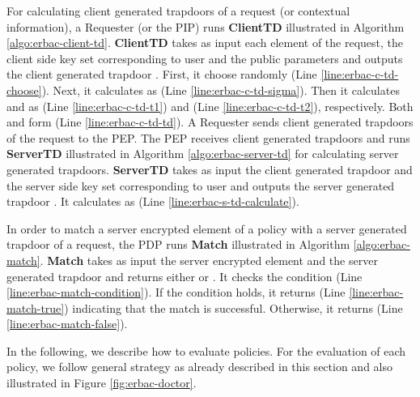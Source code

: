 \documentclass[epsfig,a4paper,11pt,titlepage]{book}
\numberwithin{algorithm}{chapter}
\begin{document}
For calculating client generated trapdoors of a request (or contextual information), a Requester (or the \gls{PIP}) runs \textbf{ClientTD} illustrated in Algorithm \ref{algo:erbac-client-td}. \textbf{ClientTD} takes as input each element  of the request, the client side key set  corresponding to user  and the public parameters  and outputs the client generated trapdoor . First, it choose randomly  (Line \ref{line:erbac-c-td-choose}). Next, it calculates  as  (Line \ref{line:erbac-c-td-sigma}). Then it calculates  and  as  (Line \ref{line:erbac-c-td-t1}) and  (Line \ref{line:erbac-c-td-t2}), respectively. Both  and  form  (Line \ref{line:erbac-c-td-td}). A Requester sends client generated trapdoors of the request to the \gls{PEP}.
The \gls{PEP} receives client generated trapdoors and runs \textbf{ServerTD} illustrated in Algorithm \ref{algo:erbac-server-td} for calculating server generated trapdoors. \textbf{ServerTD} takes as input the client generated trapdoor  and the server side key set  corresponding to user  and outputs the server generated trapdoor . It calculates  as   (Line \ref{line:erbac-s-td-calculate}).

In order to match a server encrypted element of a policy with a server generated trapdoor of a request, the \gls{PDP} runs \textbf{Match} illustrated in Algorithm \ref{algo:erbac-match}. \textbf{Match} takes as input the server encrypted element  and the server generated trapdoor  and returns either  or . It checks the condition  (Line \ref{line:erbac-match-condition}). If the condition holds, it returns  (Line \ref{line:erbac-match-true}) indicating that the match is successful. Otherwise, it returns  (Line \ref{line:erbac-match-false}). 

In the following, we describe how to evaluate policies. For the evaluation of each policy, we follow general strategy as already described in this section and also illustrated in Figure \ref{fig:erbac-doctor}.
\end{document}
